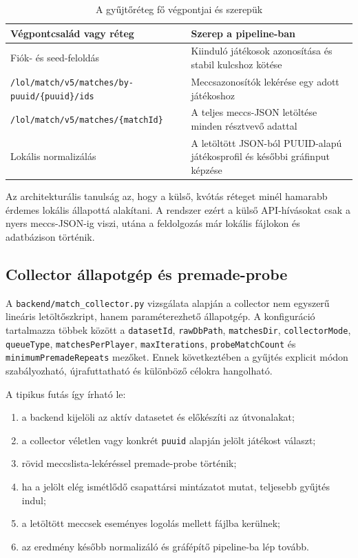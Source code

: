 ﻿\documentclass[a4paper,12pt]{report}
\begin{document}
\begin{table}[H]
\centering
\caption{A gyűjtőréteg fő végpontjai és szerepük}
\begin{tabularx}{\textwidth}{>{\raggedright\arraybackslash}p{4.4cm}X}
\toprule
\textbf{Végpontcsalád vagy réteg} & \textbf{Szerep a pipeline-ban} \\
\midrule
Fiók- és seed-feloldás & Kiinduló játékosok azonosítása és stabil kulcshoz kötése \\
\texttt{/lol/match/v5/matches/by-puuid/\{puuid\}/ids} & Meccsazonosítók lekérése egy adott játékoshoz \\
\texttt{/lol/match/v5/matches/\{matchId\}} & A teljes meccs-JSON letöltése minden résztvevő adattal \\
Lokális normalizálás & A letöltött JSON-ból PUUID-alapú játékosprofil és későbbi gráfinput képzése \\
\bottomrule
\end{tabularx}
\end{table}

Az architekturális tanulság az, hogy a külső, kvótás réteget minél hamarabb érdemes lokális állapottá alakítani. A rendszer ezért a külső API-hívásokat csak a nyers meccs-JSON-ig viszi, utána a feldolgozás már lokális fájlokon és adatbázison történik.

\subsection{Collector állapotgép és premade-probe}

A \texttt{backend/match\_collector.py} vizsgálata alapján a collector nem egyszerű lineáris letöltőszkript, hanem paraméterezhető állapotgép. A konfiguráció tartalmazza többek között a \texttt{datasetId}, \texttt{rawDbPath}, \texttt{matchesDir}, \texttt{collectorMode}, \texttt{queueType}, \texttt{matchesPerPlayer}, \texttt{maxIterations}, \texttt{probeMatchCount} és \texttt{minimumPremadeRepeats} mezőket. Ennek következtében a gyűjtés explicit módon szabályozható, újrafuttatható és különböző célokra hangolható.

A tipikus futás így írható le:

\begin{enumerate}
    \item a backend kijelöli az aktív datasetet és előkészíti az útvonalakat;
    \item a collector véletlen vagy konkrét \texttt{puuid} alapján jelölt játékost választ;
    \item rövid meccslista-lekéréssel premade-probe történik;
    \item ha a jelölt elég ismétlődő csapattársi mintázatot mutat, teljesebb gyűjtés indul;
    \item a letöltött meccsek eseményes logolás mellett fájlba kerülnek;
    \item az eredmény később normalizáló és gráfépítő pipeline-ba lép tovább.
\end{enumerate}
\end{document}
